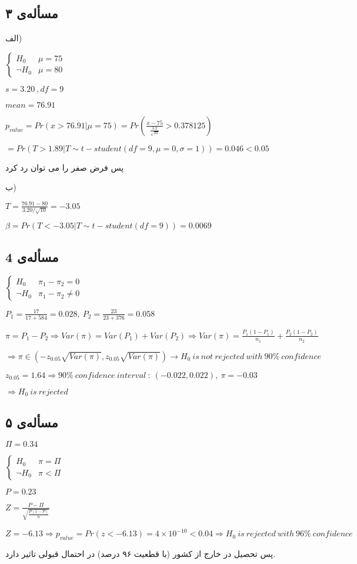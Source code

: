 \documentclass[12pt]{article}
\begin{document}
\subsection*{مسأله‌ی ۳}
الف)
\begin{flushleft}
$
\begin{cases}
H_0& \mu=75 \\
\neg H_0 &\mu= 80
\end{cases}
$

$s=3.20\ , df=9$

$mean=76.91$

$p_{value}=Pr(x>76.91|\mu=75)=Pr(\frac{x-75}{\frac{3.2}{\sqrt{10}}}>0.378125)$

$=Pr(T>1.89|T\sim t-student(df=9,\mu=0,\sigma=1))=0.046<0.05$

\end{flushleft}
پس فرض صفر را می توان رد کرد

ب)
\begin{flushleft}
$T=\frac{76.91-80}{3.20/\sqrt{10}}=-3.05$

$\beta=Pr(T<-3.05|T\sim t-student(df=9))=0.0069$
\end{flushleft}
\subsection*{مسأله‌ی 4}
\begin{flushleft}
$
\begin{cases}
H_0 & \pi_1-\pi_2=0 \\
\neg H_0 & \pi_1-\pi_2 \neq 0
\end{cases}
$

$P_1=\frac{17}{17+584}=0.028,\ P_2=\frac{23}{23+376}=0.058$

$\pi=P_1-P_2\Rightarrow Var(\pi)=Var(P_1)+Var(P_2)\Rightarrow Var(\pi)=\frac{P_1(1-P_1)}{n_1}+\frac{P_2(1-P_2)}{n_2}$

$\Rightarrow \pi \in (-z_{0.05}\sqrt{Var(\pi)},z_{0.05}\sqrt{Var(\pi)}) \rightarrow H_0\ is \ not\ rejected\ with \ 90\% \ confidence $

$z_{0.05}=1.64\Rightarrow 90\% \ confidence \ interval\ :\ (-0.022,0.022),\ \pi=-0.03$

$\Rightarrow H_0\ is\ rejected$
\end{flushleft}
\subsection*{مسأله‌ی ۵}
\begin{flushleft}
$\Pi=0.34$

$
\begin{cases}
H_0 & \pi=\Pi \\
\neg H_0 & \pi < \Pi
\end{cases}
$

$P=0.23$

$Z=\frac{P-\Pi}{\sqrt{\frac{P(1-P)}{n}}}$

$Z=-6.13\Rightarrow p_{value}=Pr(z<-6.13)=4\times 10^{-10}<0.04\Rightarrow H_0\ is\ rejected\ with\ 96\% \ confidence $
\end{flushleft}
پس تحصیل در خارج از کشور (با قطعیت ۹۶ درصد) در احتمال قبولی تاثیر دارد.
\end{document}

